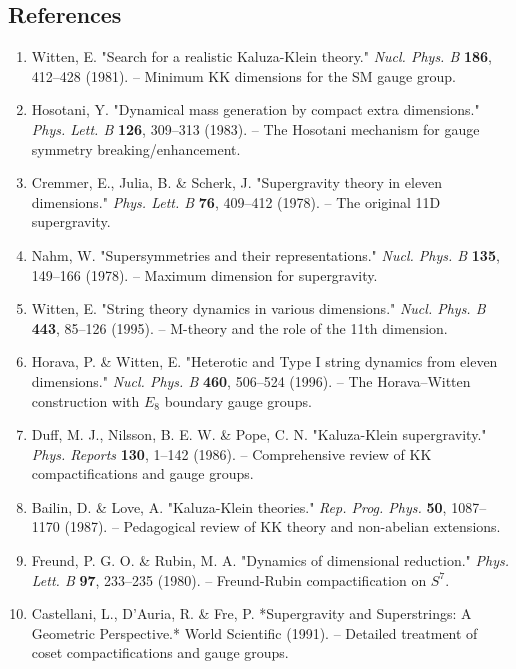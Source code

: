 \documentclass[aps,prd,preprint,superscriptaddress,longbibliography,floatfix]{revtex4-2}
\theoremstyle{remark}
\begin{document}
\subsection{References}


\begin{enumerate}
  \item Witten, E. "Search for a realistic Kaluza-Klein theory." \textit{Nucl. Phys. B} \textbf{186}, 412--428 (1981). -- Minimum KK dimensions for the SM gauge group.
  \item Hosotani, Y. "Dynamical mass generation by compact extra dimensions." \textit{Phys. Lett. B} \textbf{126}, 309--313 (1983). -- The Hosotani mechanism for gauge symmetry breaking/enhancement.
  \item Cremmer, E., Julia, B. \& Scherk, J. "Supergravity theory in eleven dimensions." \textit{Phys. Lett. B} \textbf{76}, 409--412 (1978). -- The original 11D supergravity.
  \item Nahm, W. "Supersymmetries and their representations." \textit{Nucl. Phys. B} \textbf{135}, 149--166 (1978). -- Maximum dimension for supergravity.
  \item Witten, E. "String theory dynamics in various dimensions." \textit{Nucl. Phys. B} \textbf{443}, 85--126 (1995). -- M-theory and the role of the 11th dimension.
  \item Horava, P. \& Witten, E. "Heterotic and Type I string dynamics from eleven dimensions." \textit{Nucl. Phys. B} \textbf{460}, 506--524 (1996). -- The Horava--Witten construction with $E_8$ boundary gauge groups.
  \item Duff, M. J., Nilsson, B. E. W. \& Pope, C. N. "Kaluza-Klein supergravity." \textit{Phys. Reports} \textbf{130}, 1--142 (1986). -- Comprehensive review of KK compactifications and gauge groups.
  \item Bailin, D. \& Love, A. "Kaluza-Klein theories." \textit{Rep. Prog. Phys.} \textbf{50}, 1087--1170 (1987). -- Pedagogical review of KK theory and non-abelian extensions.
  \item Freund, P. G. O. \& Rubin, M. A. "Dynamics of dimensional reduction." \textit{Phys. Lett. B} \textbf{97}, 233--235 (1980). -- Freund-Rubin compactification on $S^7$.
  \item Castellani, L., D'Auria, R. \& Fre, P. *Supergravity and Superstrings: A Geometric Perspective.* World Scientific (1991). -- Detailed treatment of coset compactifications and gauge groups.
\end{enumerate}
\end{document}

